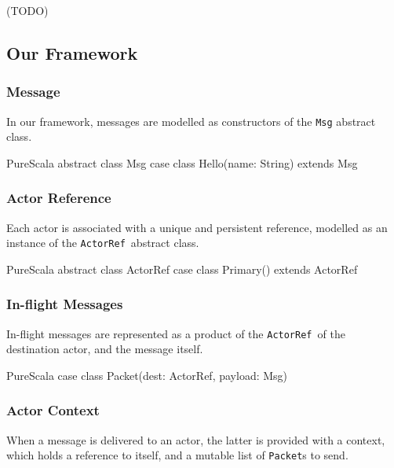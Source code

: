 \documentclass[a4paper,twoside]{article}
\newcommand{\InlineS}[1]{\lstinline[language=PureScala,basicstyle=\small\ttfamily,columns=fixed]|#1|}
\newcommand{\TODO}[1]{\textcolor{YellowOrange}{(TODO)}} %
\newcommand{\ActorRef}{\InlineS{ActorRef}\ }
\begin{document}
\TODO{Actor Model}

\subsection{Our Framework}

\subsubsection*{Message}

In our framework, messages are modelled as constructors of the \InlineS{Msg} abstract class.

\begin{ShortCode}{PureScala}
abstract class Msg
case class Hello(name: String) extends Msg
\end{ShortCode}

\vspace{-15pt}
\subsubsection*{Actor Reference}

Each actor is associated with a unique and persistent reference, modelled as an instance of the \ActorRef abstract class.

\begin{ShortCode}{PureScala}
abstract class ActorRef
case class Primary() extends ActorRef
\end{ShortCode}

\vspace{-15pt}
\subsubsection*{In-flight Messages}

In-flight messages are represented as a product of the \ActorRef of the destination actor, and the message itself.

\begin{ShortCode}{PureScala}
case class Packet(dest: ActorRef, payload: Msg)
\end{ShortCode}

\vspace{-15pt}
\subsubsection*{Actor Context}

When a message is delivered to an actor, the latter is provided with a context,
which holds a reference to itself, and a mutable list of \InlineS{Packet}s to send.
\end{document}
